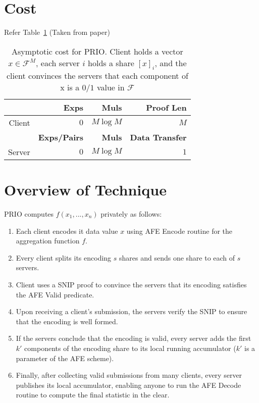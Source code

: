 \section{Cost}
Refer Table~\ref{asymptoticcost} (Taken from paper)

\begin{table}
	\centering
	\begin{tabular}{ |r|r|r|r| } 
		\hline
		& \textbf{Exps} & \textbf{Muls} & \textbf{Proof Len} \\ \hline
		Client  & $0$ & $M \log M$ & $M$ \\ \hline
		& \textbf{Exps/Pairs} & \textbf{Muls} & \textbf{Data Transfer} \\ \hline
		Server  & $0$ & $M\log M$ & $1$ \\ \hline
	\end{tabular}
	\caption{Asymptotic cost for PRIO. Client holds a vector $x \in \mathcal{F}^M$, each server $i$ holds a share $[x]_i$, and the client convinces the servers that each component of x is a $0/1$ value in $\mathcal{F}$}
        \label{asymptoticcost}
\end{table}


\section{Overview of Technique}
PRIO computes $f(x_1, ..., x_n)$ privately as follows:
\begin{enumerate}
    \item Each client encodes it data value $x$ using AFE Encode routine for the aggregation function $f$.
    \item Every client splits its encoding $s$ shares and sends one share to each of $s$ servers.
    \item Client uses a SNIP proof to convince the servers that its encoding satisfies the AFE Valid predicate.
    \item Upon receiving a client's submission, the servers verify the SNIP to ensure that the encoding is well formed.
    \item If the servers conclude that the encoding is valid, every server adds the first $k'$ components of the encoding share to its local running accumulator ($k'$ is a parameter of the AFE scheme).
    \item Finally, after collecting valid submissions from many clients, every server publishes its local accumulator, enabling anyone to run the AFE Decode routine to compute the final statistic in the clear.
\end{enumerate}



%
